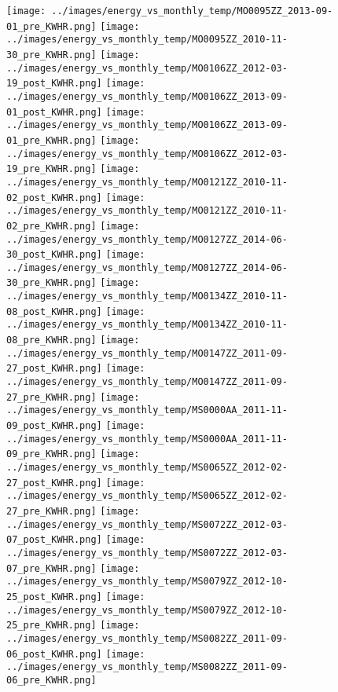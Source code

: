 \clearpage
\begin{figure}
\centering
\texttt{[image: ../images/energy\_vs\_monthly\_temp/MO0095ZZ\_2013-09-01\_pre\_KWHR.png]}
\texttt{[image: ../images/energy\_vs\_monthly\_temp/MO0095ZZ\_2010-11-30\_pre\_KWHR.png]}
\texttt{[image: ../images/energy\_vs\_monthly\_temp/MO0106ZZ\_2012-03-19\_post\_KWHR.png]}
\texttt{[image: ../images/energy\_vs\_monthly\_temp/MO0106ZZ\_2013-09-01\_post\_KWHR.png]}
\texttt{[image: ../images/energy\_vs\_monthly\_temp/MO0106ZZ\_2013-09-01\_pre\_KWHR.png]}
\texttt{[image: ../images/energy\_vs\_monthly\_temp/MO0106ZZ\_2012-03-19\_pre\_KWHR.png]}
\texttt{[image: ../images/energy\_vs\_monthly\_temp/MO0121ZZ\_2010-11-02\_post\_KWHR.png]}
\texttt{[image: ../images/energy\_vs\_monthly\_temp/MO0121ZZ\_2010-11-02\_pre\_KWHR.png]}
\texttt{[image: ../images/energy\_vs\_monthly\_temp/MO0127ZZ\_2014-06-30\_post\_KWHR.png]}
\texttt{[image: ../images/energy\_vs\_monthly\_temp/MO0127ZZ\_2014-06-30\_pre\_KWHR.png]}
\texttt{[image: ../images/energy\_vs\_monthly\_temp/MO0134ZZ\_2010-11-08\_post\_KWHR.png]}
\texttt{[image: ../images/energy\_vs\_monthly\_temp/MO0134ZZ\_2010-11-08\_pre\_KWHR.png]}
\texttt{[image: ../images/energy\_vs\_monthly\_temp/MO0147ZZ\_2011-09-27\_post\_KWHR.png]}
\texttt{[image: ../images/energy\_vs\_monthly\_temp/MO0147ZZ\_2011-09-27\_pre\_KWHR.png]}
\texttt{[image: ../images/energy\_vs\_monthly\_temp/MS0000AA\_2011-11-09\_post\_KWHR.png]}
\texttt{[image: ../images/energy\_vs\_monthly\_temp/MS0000AA\_2011-11-09\_pre\_KWHR.png]}
\texttt{[image: ../images/energy\_vs\_monthly\_temp/MS0065ZZ\_2012-02-27\_post\_KWHR.png]}
\texttt{[image: ../images/energy\_vs\_monthly\_temp/MS0065ZZ\_2012-02-27\_pre\_KWHR.png]}
\texttt{[image: ../images/energy\_vs\_monthly\_temp/MS0072ZZ\_2012-03-07\_post\_KWHR.png]}
\texttt{[image: ../images/energy\_vs\_monthly\_temp/MS0072ZZ\_2012-03-07\_pre\_KWHR.png]}
\texttt{[image: ../images/energy\_vs\_monthly\_temp/MS0079ZZ\_2012-10-25\_post\_KWHR.png]}
\texttt{[image: ../images/energy\_vs\_monthly\_temp/MS0079ZZ\_2012-10-25\_pre\_KWHR.png]}
\texttt{[image: ../images/energy\_vs\_monthly\_temp/MS0082ZZ\_2011-09-06\_post\_KWHR.png]}
\texttt{[image: ../images/energy\_vs\_monthly\_temp/MS0082ZZ\_2011-09-06\_pre\_KWHR.png]}
\end{figure}
